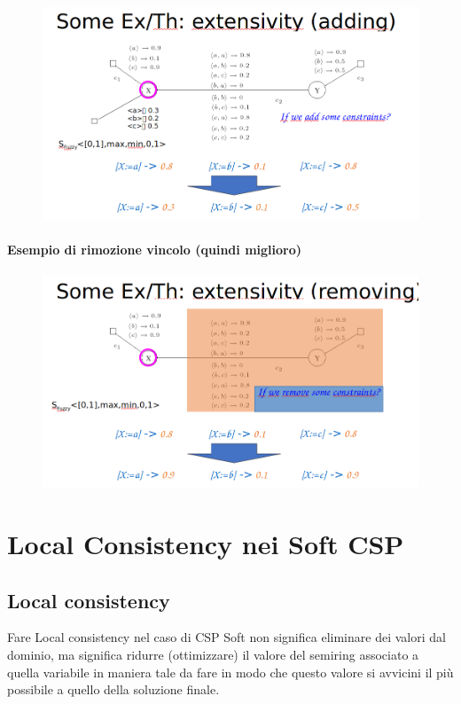 \begin{figure}[H]
    \centering
    \includegraphics[width=12.5cm, keepaspectratio]{img/Cap4/worst2.png}
\end{figure}

\subsubsection{Esempio di rimozione vincolo (quindi miglioro)}
\begin{figure}[H]
    \centering
    \includegraphics[width=12.5cm, keepaspectratio]{img/Cap4/better2.png}
\end{figure}


\chapter{Local Consistency nei Soft CSP} \label{ch:Local Consistency nei Soft
    CSP}
\section{Local consistency}
Fare Local consistency nel caso di CSP Soft non significa eliminare dei valori
dal dominio, ma significa ridurre (ottimizzare) il valore del semiring associato
a quella variabile in maniera tale da fare in modo che questo valore si avvicini
il più possibile a quello della soluzione finale.


